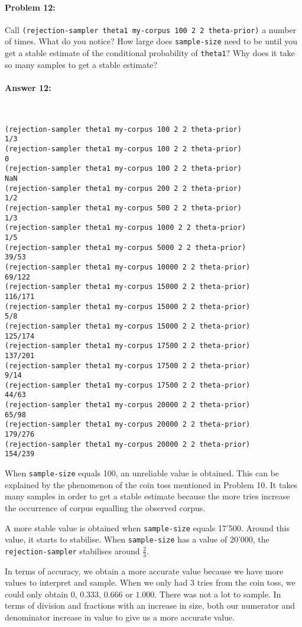\documentclass[12pt, letterpaper]{article}
\begin{document}
\hrulefill
\paragraph{Problem 12:}

Call \texttt{(rejection-sampler theta1 my-corpus 100 2 2 theta-prior)}
a number of times. What do you notice? How large does
\texttt{sample-size} need to be until you get a stable estimate of the
conditional probability of \texttt{theta1}? Why does it take so many
samples to get a stable estimate?

\paragraph{Answer 12:}~\begin{lstlisting}
(rejection-sampler theta1 my-corpus 100 2 2 theta-prior)
1/3
(rejection-sampler theta1 my-corpus 100 2 2 theta-prior)
0
(rejection-sampler theta1 my-corpus 100 2 2 theta-prior)
NaN
(rejection-sampler theta1 my-corpus 200 2 2 theta-prior)
1/2
(rejection-sampler theta1 my-corpus 500 2 2 theta-prior)
1/3
(rejection-sampler theta1 my-corpus 1000 2 2 theta-prior)
1/5
(rejection-sampler theta1 my-corpus 5000 2 2 theta-prior)
39/53
(rejection-sampler theta1 my-corpus 10000 2 2 theta-prior)
69/122
(rejection-sampler theta1 my-corpus 15000 2 2 theta-prior)
116/171
(rejection-sampler theta1 my-corpus 15000 2 2 theta-prior)
5/8
(rejection-sampler theta1 my-corpus 15000 2 2 theta-prior)
125/174
(rejection-sampler theta1 my-corpus 17500 2 2 theta-prior)
137/201
(rejection-sampler theta1 my-corpus 17500 2 2 theta-prior)
9/14
(rejection-sampler theta1 my-corpus 17500 2 2 theta-prior)
44/63
(rejection-sampler theta1 my-corpus 20000 2 2 theta-prior)
65/98
(rejection-sampler theta1 my-corpus 20000 2 2 theta-prior)
179/276
(rejection-sampler theta1 my-corpus 20000 2 2 theta-prior)
154/239
\end{lstlisting}
When \texttt{sample-size} equals 100, an unreliable value is obtained. This can be explained by the phenomenon of the coin toss mentioned in Problem 10. It takes many samples in order to get a stable estimate because the more tries increase the occurrence of corpus equalling the observed corpus.

A more stable value is obtained when \texttt{sample-size} equals 17'500. Around this value, it starts to stabilise. When \texttt{sample-size} has a value of 20'000, the \texttt{rejection-sampler} stabilises around $\frac{2}{3}$.

In terms of accuracy, we obtain a more accurate value because we have more values to interpret and sample. When we only had 3 tries from the coin toss, we could only obtain $0$, $0.333$, $0.666$ or $1.000$. There was not a lot to sample. In terms of division and fractions with an increase in size, both our numerator and denominator increase in value to give us a more accurate value.
\end{document}
